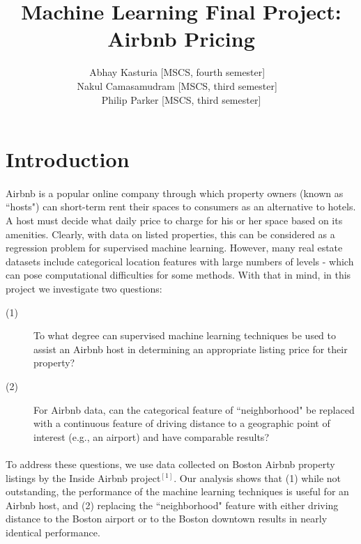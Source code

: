 \documentclass[11pt]{article}
\title{Machine Learning Final Project: Airbnb Pricing}
\author{Abhay Kasturia [MSCS, fourth semester] ~\\ Nakul Camasamudram [MSCS, third semester] ~\\ Philip Parker [MSCS, third semester]}
\date{}
\begin{document}
	\maketitle
    
	\section{Introduction}
    	\paragraph{}
        	Airbnb is a popular online company through which property owners (known as ``hosts") can short-term rent their spaces to consumers as an alternative to hotels. A host must decide what daily price to charge for his or her space based on its amenities. Clearly, with data on listed properties, this can be considered as a regression problem for supervised machine learning. However, many real estate datasets include categorical location features with large numbers of levels - which can pose computational difficulties for some methods. With that in mind, in this project we investigate two questions:
			\begin{description}
            	\item[(1)] To what degree can supervised machine learning techniques be used to assist an Airbnb host in determining an appropriate listing price for their property?
                \item[(2)] For Airbnb data, can the categorical feature of ``neighborhood" be replaced with a continuous feature of driving distance to a geographic point of interest (e.g., an airport) and have comparable results?
            \end{description}
            
		\paragraph{}
            To address these questions, we use data collected on Boston Airbnb property listings by the Inside Airbnb project$^{[1]}$. Our analysis shows that (1) while not outstanding, the performance of the machine learning techniques is useful for an Airbnb host, and (2) replacing the ``neighborhood" feature with either driving distance to the Boston airport or to the Boston downtown results in nearly identical performance.
            
\end{document}
